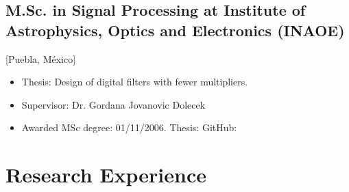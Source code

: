 \documentclass{mycv}
\begin{document}
\subsection{M.Sc. in Signal Processing at Institute of Astrophysics, Optics and Electronics (INAOE)}[Puebla, M\'exico]
\begin{itemize}[label={}]
  \item Thesis: Design of digital filters with fewer multipliers. 
  \item Supervisor: Dr. Gordana Jovanovic Dolecek 
  \item Awarded MSc degree: 01/11/2006.
  	Thesis: \href{https://github.com/mxochicale/publications/blob/master/thesis/M.Sc./doc/MPXochicale_MScThesis-2016.pdf}{\faFilePdf}
	GitHub: \href{https://github.com/mxochicale/publications/tree/master/thesis/M.Sc.}{\faGithub*}
\end{itemize}


\section{Research Experience}
\end{document}
